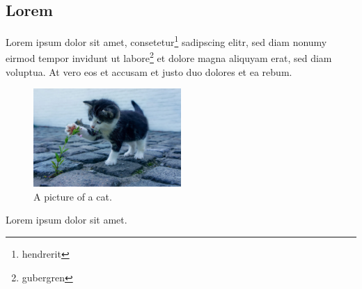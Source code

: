 \documentclass[12pt]{scrartcl}
\begin{document}
\subsection{Lorem}

Lorem ipsum dolor sit amet, consetetur\footnote{hendrerit} sadipscing elitr,
sed diam nonumy eirmod tempor invidunt ut labore\footnote{gubergren} et dolore
magna aliquyam erat, sed diam voluptua. At vero eos et accusam et justo duo
dolores et ea rebum.

\begin{figure}[H]
    \centering
    \includegraphics[width=0.5\textwidth]{template-cat1.jpg}
    \caption{A picture of a cat.}
\end{figure}

Lorem ipsum dolor sit amet.
\end{document}
